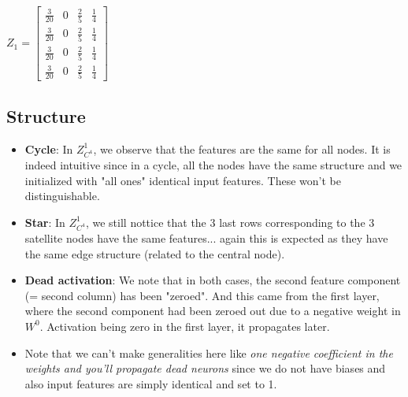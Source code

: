 \documentclass[a4paper]{article}
\begin{document}
$Z_{1} = \left[\begin{matrix}\frac{3}{20} & 0 & \frac{2}{5} & \frac{1}{4}\\\frac{3}{20} & 0 & \frac{2}{5} & \frac{1}{4}\\\frac{3}{20} & 0 & \frac{2}{5} & \frac{1}{4}\\\frac{3}{20} & 0 & \frac{2}{5} & \frac{1}{4}\end{matrix}\right]$

\subsection*{Structure}
\begin{itemize}
    \item \textbf{Cycle}: In $Z^{1}_{C^{4}}$, we observe that the features are the same for all nodes. It is indeed intuitive since in a cycle,
all the nodes have the same structure and we initialized with "all ones" identical input features.
These won't be distinguishable.
    \item \textbf{Star}: In $Z^{1}_{C^{4}}$, we still nottice that the 3 last rows corresponding to the 3 satellite nodes
have the same features... again this is expected as they have the same edge structure (related to the central node).
    \item \textbf{Dead activation}: We note that in both cases, the second feature component (= second column) has been "zeroed". And this came from the first layer, where the second component had been zeroed out due to a negative weight in $W^{0}$.
    Activation being zero in the first layer, it propagates later. 
    \item Note that we can't make generalities here like 
    \textit{one negative coefficient in the weights and you'll propagate dead neurons} 
    since we do not have biases and also input features are simply identical and set to 1.
\end{itemize}

\end{document}
